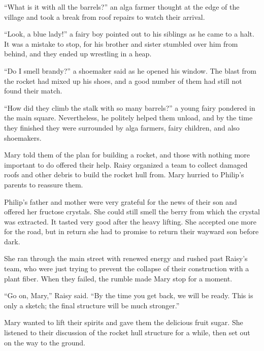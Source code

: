 \documentclass[10pt]{memoir}
\begin{document}
``What is it with all the barrels?'' an alga farmer thought at the edge of the
village and took a break from roof repairs to watch their arrival.

``Look, a blue lady!'' a fairy boy pointed out to his siblings as he came to a
halt. It was a mistake to stop, for his brother and sister stumbled over him
from behind, and they ended up wrestling in a heap.

``Do I smell brandy?'' a shoemaker said as he opened his window. The blast from
the rocket had mixed up his shoes, and a good number of them had still not
found their match.

``How did they climb the stalk with so many barrels?'' a young fairy pondered
in the main square. Nevertheless, he politely helped them unload, and by the
time they finished they were surrounded by alga farmers, fairy children, and
also shoemakers.

Mary told them of the plan for building a rocket, and those with nothing more
important to do offered their help. Raisy organized a team to collect damaged
roofs and other debris to build the rocket hull from. Mary hurried to Philip's
parents to reassure them.

Philip's father and mother were very grateful for the news of their son and
offered her fructose crystals. She could still smell the berry from which the
crystal was extracted. It tasted very good after the heavy lifting. She
accepted one more for the road, but in return she had to promise to return
their wayward son before dark.

She ran through the main street with renewed energy and rushed past Raisy's
team, who were just trying to prevent the collapse of their construction with a
plant fiber. When they failed, the rumble made Mary stop for a moment.

``Go on, Mary,'' Raisy said. ``By the time you get back, we will be ready. This
is only a sketch; the final structure will be much stronger.''

Mary wanted to lift their spirits and gave them the delicious fruit sugar. She
listened to their discussion of the rocket hull structure for a while, then set
out on the way to the ground.
\end{document}
